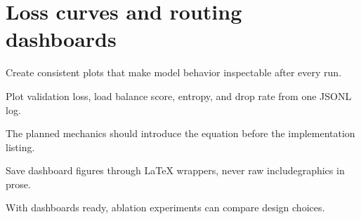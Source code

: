 \section{Loss curves and routing dashboards}
\label{sec:ch11-loss-curves-and-routing-dashboards}

Create consistent plots that make model behavior inspectable after every run.



Plot validation loss, load balance score, entropy, and drop rate from one JSONL log.



The planned mechanics should introduce the equation before the implementation listing.





\begin{checkpointbox}
Save dashboard figures through LaTeX wrappers, never raw includegraphics in prose.
\end{checkpointbox}

With dashboards ready, ablation experiments can compare design choices.
